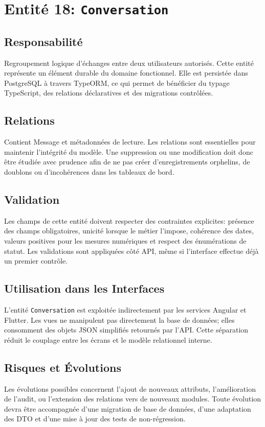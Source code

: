 \section{Entité 18: \texttt{Conversation}}
\subsection{Responsabilité}
Regroupement logique d’échanges entre deux utilisateurs autorisés. Cette entité représente un élément durable du domaine fonctionnel. Elle est persistée dans PostgreSQL à travers TypeORM, ce qui permet de bénéficier du typage TypeScript, des relations déclaratives et des migrations contrôlées.

\subsection{Relations}
Contient Message et métadonnées de lecture. Les relations sont essentielles pour maintenir l'intégrité du modèle. Une suppression ou une modification doit donc être étudiée avec prudence afin de ne pas créer d'enregistrements orphelins, de doublons ou d'incohérences dans les tableaux de bord.

\subsection{Validation}
Les champs de cette entité doivent respecter des contraintes explicites: présence des champs obligatoires, unicité lorsque le métier l'impose, cohérence des dates, valeurs positives pour les mesures numériques et respect des énumérations de statut. Les validations sont appliquées côté API, même si l'interface effectue déjà un premier contrôle.

\subsection{Utilisation dans les Interfaces}
L'entité \texttt{Conversation} est exploitée indirectement par les services Angular et Flutter. Les vues ne manipulent pas directement la base de données; elles consomment des objets JSON simplifiés retournés par l'API. Cette séparation réduit le couplage entre les écrans et le modèle relationnel interne.

\subsection{Risques et Évolutions}
Les évolutions possibles concernent l'ajout de nouveaux attributs, l'amélioration de l'audit, ou l'extension des relations vers de nouveaux modules. Toute évolution devra être accompagnée d'une migration de base de données, d'une adaptation des DTO et d'une mise à jour des tests de non-régression.

